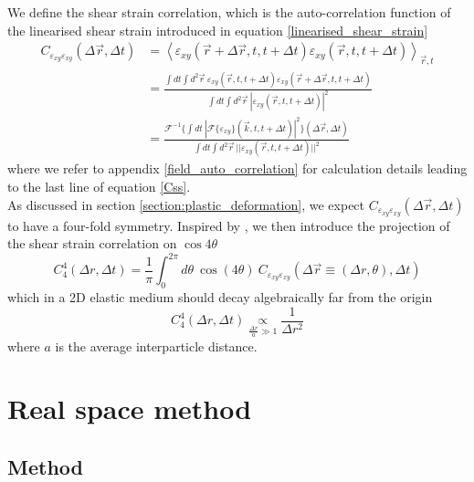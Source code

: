 \documentclass[class=report, float=false, crop=false]{standalone}
\begin{document}
We define the shear strain correlation, which is the auto-correlation function of the linearised shear strain introduced in equation \ref{linearised_shear_strain}
\begin{equation}
\begin{aligned}
C_{\varepsilon_{xy}\varepsilon_{xy}}(\Delta \vec{r}, \Delta t) &= \left<\varepsilon_{xy}(\vec{r}+\Delta\vec{r}, t, t + \Delta t)\varepsilon_{xy}(\vec{r}, t, t + \Delta t)\right>_{\vec{r}, t}\\
&= \frac{\int dt \int d^2\vec{r}~ \varepsilon_{xy}(\vec{r}, t, t+\Delta t)\varepsilon_{xy}(\vec{r} + \Delta \vec{r}, t, t+\Delta t)}{\int dt \int d^2\vec{r}~ |\varepsilon_{xy}(\vec{r}, t, t+\Delta t)|^2}\\
&= \frac{\mathcal{F}^{-1}\{\int dt~ |\mathcal{F}\{\varepsilon_{xy}\}(\vec{k}, t, t + \Delta t)|^2\}(\Delta \vec{r}, \Delta t)}{\int dt \int d^2\vec{r}~ ||\varepsilon_{xy}(\vec{r}, t, t+\Delta t)||^2}
\end{aligned}
\label{Css}
\end{equation}
where we refer to appendix \ref{field_auto_correlation} for calculation details leading to the last line of equation \ref{Css}.\\

As discussed in section \ref{section:plastic_deformation}, we expect $C_{\varepsilon_{xy}\varepsilon_{xy}}(\Delta \vec{r}, \Delta t)$ to have a four-fold symmetry. Inspired by \cite{illing2016strain}, we then introduce the projection of the shear strain correlation on $\cos4\theta$
\begin{equation}
C_4^4(\Delta r, \Delta t) = \frac{1}{\pi} \int_0^{2\pi} d\theta~ \cos(4\theta)~ C_{\varepsilon_{xy}\varepsilon_{xy}}(\Delta\vec{r}\equiv(\Delta r, \theta), \Delta t)
\label{c44_definition}
\end{equation}
which in a 2D elastic medium should decay algebraically far from the origin
\begin{equation}
C_4^4(\Delta r, \Delta t) \underset{\frac{\Delta r}{a} \gg 1}{\propto} \frac{1}{\Delta r^2}
\end{equation}
where $a$ is the average interparticle distance.

\section{Real space method}

\subsection{Method}
\end{document}
